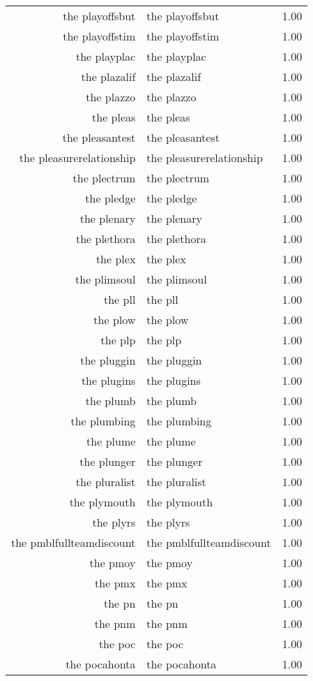 \begin{table}[ht]
\begin{tabular}{rlr}
  the playoffsbut & the playoffsbut & 1.00 \\ 
  the playoffstim & the playoffstim & 1.00 \\ 
  the playplac & the playplac & 1.00 \\ 
  the plazalif & the plazalif & 1.00 \\ 
  the plazzo & the plazzo & 1.00 \\ 
  the pleas & the pleas & 1.00 \\ 
  the pleasantest & the pleasantest & 1.00 \\ 
  the pleasurerelationship & the pleasurerelationship & 1.00 \\ 
  the plectrum & the plectrum & 1.00 \\ 
  the pledge & the pledge & 1.00 \\ 
  the plenary & the plenary & 1.00 \\ 
  the plethora & the plethora & 1.00 \\ 
  the plex & the plex & 1.00 \\ 
  the plimsoul & the plimsoul & 1.00 \\ 
  the pll & the pll & 1.00 \\ 
  the plow & the plow & 1.00 \\ 
  the plp & the plp & 1.00 \\ 
  the pluggin & the pluggin & 1.00 \\ 
  the plugins & the plugins & 1.00 \\ 
  the plumb & the plumb & 1.00 \\ 
  the plumbing & the plumbing & 1.00 \\ 
  the plume & the plume & 1.00 \\ 
  the plunger & the plunger & 1.00 \\ 
  the pluralist & the pluralist & 1.00 \\ 
  the plymouth & the plymouth & 1.00 \\ 
  the plyrs & the plyrs & 1.00 \\ 
  the pmblfullteamdiscount & the pmblfullteamdiscount & 1.00 \\ 
  the pmoy & the pmoy & 1.00 \\ 
  the pmx & the pmx & 1.00 \\ 
  the pn & the pn & 1.00 \\ 
  the pnm & the pnm & 1.00 \\ 
  the poc & the poc & 1.00 \\ 
  the pocahonta & the pocahonta & 1.00 \\ 

\end{tabular}
\end{table}
